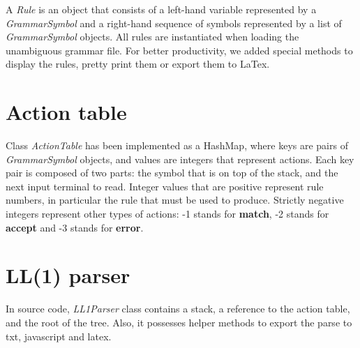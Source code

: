 A \textit{Rule} is an object that consists of a left-hand variable represented by a \textit{GrammarSymbol} and a right-hand sequence
of symbols represented by a list of \textit{GrammarSymbol} objects. All rules are instantiated when loading the unambiguous grammar file.
For better productivity, we added special methods to display the rules, pretty print them or export them to LaTex.

\section{Action table}

Class \textit{ActionTable} has been implemented as a HashMap, where keys are pairs of \textit{GrammarSymbol} objects, and values are integers
that represent actions. Each key pair is composed of two parts: the symbol that is on top of the stack, and the next input terminal to read.
Integer values that are positive represent rule numbers, in particular the rule that must be used to produce. Strictly negative integers
represent other types of actions: -1 stands for \textbf{match}, -2 stands for \textbf{accept} and -3 stands for \textbf{error}.

\section{LL(1) parser}

In source code, \textit{LL1Parser} class contains a stack, a reference to the action table, and the root of the tree. Also, it possesses helper
methods to export the parse to txt, javascript and latex.

